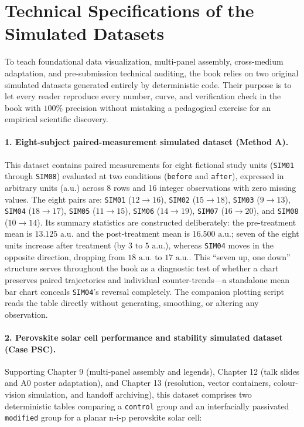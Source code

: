 \section{Technical Specifications of the Simulated Datasets}

To teach foundational data visualization, multi-panel assembly, cross-medium adaptation, and pre-submission technical auditing, the book relies on two original simulated datasets generated entirely by deterministic code. Their purpose is to let every reader reproduce every number, curve, and verification check in the book with $100\%$ precision without mistaking a pedagogical exercise for an empirical scientific discovery.

\paragraph{1. Eight-subject paired-measurement simulated dataset (Method A).}
This dataset contains paired measurements for eight fictional study units (\texttt{SIM01} through \texttt{SIM08}) evaluated at two conditions (\texttt{before} and \texttt{after}), expressed in arbitrary units (a.u.) across 8 rows and 16 integer observations with zero missing values. The eight pairs are: \texttt{SIM01} ($12 \rightarrow 16$), \texttt{SIM02} ($15 \rightarrow 18$), \texttt{SIM03} ($9 \rightarrow 13$), \texttt{SIM04} ($18 \rightarrow 17$), \texttt{SIM05} ($11 \rightarrow 15$), \texttt{SIM06} ($14 \rightarrow 19$), \texttt{SIM07} ($16 \rightarrow 20$), and \texttt{SIM08} ($10 \rightarrow 14$). Its summary statistics are constructed deliberately: the pre-treatment mean is $13.125\text{ a.u.}$ and the post-treatment mean is $16.500\text{ a.u.}$; seven of the eight units increase after treatment (by $3\text{ to }5\text{ a.u.}$), whereas \texttt{SIM04} moves in the opposite direction, dropping from $18\text{ a.u.}$ to $17\text{ a.u.}$. This ``seven up, one down'' structure serves throughout the book as a diagnostic test of whether a chart preserves paired trajectories and individual counter-trends---a standalone mean bar chart conceals \texttt{SIM04}'s reversal completely. The companion plotting script reads the table directly without generating, smoothing, or altering any observation.

\paragraph{2. Perovskite solar cell performance and stability simulated dataset (Case PSC).}
Supporting Chapter 9 (multi-panel assembly and legends), Chapter 12 (talk slides and A0 poster adaptation), and Chapter 13 (resolution, vector containers, colour-vision simulation, and handoff archiving), this dataset comprises two deterministic tables comparing a \texttt{control} group and an interfacially passivated \texttt{modified} group for a planar n-i-p perovskite solar cell:

